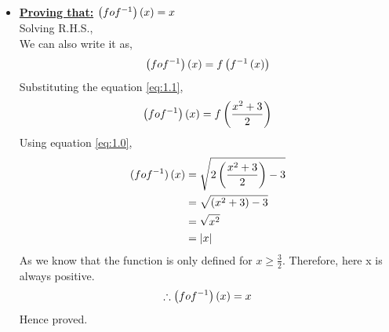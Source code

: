 \documentclass[journal,12pt,twocolumn]{IEEEtran}
\begin{document}
\begin{itemize}
\begin{align}
	\end{align}
	\item
	\textbf{\underline{Proving that:}} $\left(fof^{-1}\right)\left(x\right)=x$\\
	Solving R.H.S.,\\
	We can also write it as,
	\begin{align}
	\left(fof^{-1}\right)\left(x\right) = f\left(f^{-1}\left(x\right)\right)
	\end{align}
	Substituting the equation \eqref{eq:1.1},
	\begin{align}
	\left(fof^{-1}\right)\left(x\right) = f\left(\frac{x^{2} + 3}{2}\right)
	\end{align}
	Using equation \eqref{eq:1.0},
	\begin{align}
	(fof^{-1})\left(x\right) &= \sqrt{2\left(\frac{x^{2} + 3}{2}\right) - 3}\\
	                   &= \sqrt{(x^{2} + 3) - 3}\\
	                   &= \sqrt{x^{2}}\\
	                   &= \left\vert x\right\vert
	\end{align}
	As we know that the function is only defined for $x \geq \frac{3}{2}$. Therefore, here x is always positive.
	\begin{align}
	\therefore\left(fof^{-1}\right)\left(x\right) = x
	\end{align}
	Hence proved.
	\end{itemize}
\end{document}
